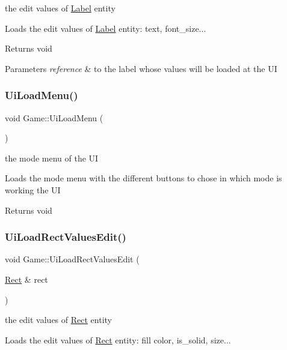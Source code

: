 the edit values of \hyperlink{class_label}{Label} entity

Loads the edit values of \hyperlink{class_label}{Label} entity\+: text, font\+\_\+size...

\begin{DoxyReturn}{Returns}
void 
\end{DoxyReturn}

\begin{DoxyParams}{Parameters}
{\em reference} & to the label whose values will be loaded at the UI \\
\hline
\end{DoxyParams}
\mbox{\label{class_game_a184082948455436281839a2e96279e17}} 
\subsubsection{\texorpdfstring{Ui\+Load\+Menu()}{UiLoadMenu()}}
{\footnotesize\ttfamily void Game\+::\+Ui\+Load\+Menu (\begin{DoxyParamCaption}{ }\end{DoxyParamCaption})}

the mode menu of the UI

Loads the mode menu with the different buttons to chose in which mode is working the UI

\begin{DoxyReturn}{Returns}
void 
\end{DoxyReturn}
\mbox{\label{class_game_a8710233ba10c51897d95b176f1bac5ca}} 
\subsubsection{\texorpdfstring{Ui\+Load\+Rect\+Values\+Edit()}{UiLoadRectValuesEdit()}}
{\footnotesize\ttfamily void Game\+::\+Ui\+Load\+Rect\+Values\+Edit (\begin{DoxyParamCaption}\item[{\hyperlink{class_rect}{Rect} \&}]{rect }\end{DoxyParamCaption})}

the edit values of \hyperlink{class_rect}{Rect} entity

Loads the edit values of \hyperlink{class_rect}{Rect} entity\+: fill color, is\+\_\+solid, size...

